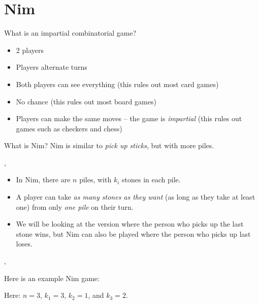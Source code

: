 \section{Nim}
	\begin{namedframe}{What is an impartial combinatorial game?}
		\begin{itemize}
			\item 2 players
			\item Players alternate turns
			\item Both players can see everything (this rules out most card games)
			\item No chance (this rules out most board games)
			\item Players can make the same moves -- the game is \emph{impartial} (this rules out games such as checkers and chess)
		\end{itemize}
	\end{namedframe}
	\begin{namedframe}{What is Nim?}
		Nim is similar to \emph{pick up sticks}, but with more piles.
		
		\sep

		\begin{itemize}
			\item In Nim, there are $n$ piles, with $k_i$ stones in each pile.
			\item A player can take \emph{as many stones as they want} (as long as they take at least one) from only \emph{one pile} on their turn.
			\item We will be looking at the version where the person who picks up the last stone wins, but Nim can also be played where the person who picks up last loses.
		\end{itemize}

		\sep

		Here is an example Nim game:
		\begin{center}
		\end{center}
		Here: $n=3$, $k_1 = 3$, $k_2 = 1$, and $k_3 = 2$.
	\end{namedframe}
